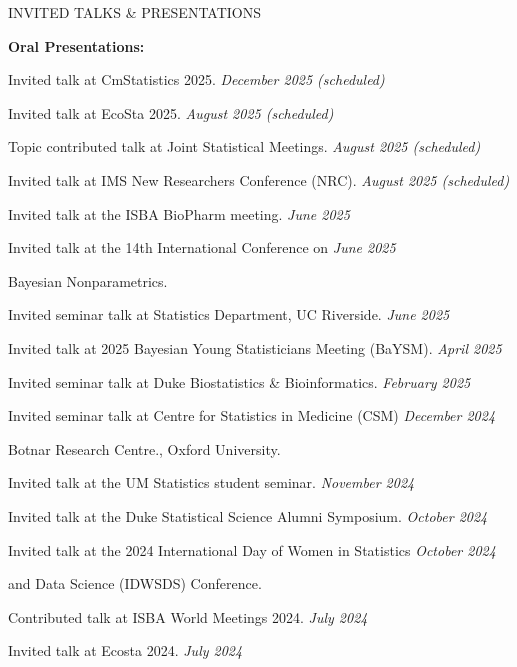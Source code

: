 \documentclass{resume} %
\newcommand{\thisYear}[1]{
	#1
}
\begin{document}
\begin{rSection}{INVITED TALKS \& PRESENTATIONS}
	
	\hspace{-.2in} {\textbf{Oral Presentations:}}
	
	Invited talk at CmStatistics 2025.  \hfill {\em December 2025 (scheduled)}
	
	Invited talk at EcoSta 2025. \hfill {\em August 2025 (scheduled)}
	
	Topic contributed talk at Joint Statistical Meetings. \hfill {\em August 2025 (scheduled)}
	
	Invited talk at IMS New Researchers Conference (NRC). \hfill {\em August 2025 (scheduled)}
	
	Invited talk at the ISBA BioPharm meeting.  \hfill {\em June 2025}
	
	Invited talk at the 14th International Conference on   \hfill {\em June 2025}
	
	\vspace*{-0.1in}
	Bayesian Nonparametrics. 
	
	Invited seminar talk at Statistics Department, UC Riverside.  \hfill {\em June 2025}
	
	Invited talk at 2025 Bayesian Young Statisticians Meeting (BaYSM). \hfill {\em April 2025}
	

	Invited seminar talk at Duke Biostatistics \& Bioinformatics.  \hfill {\em February 2025}

	

	Invited seminar talk at Centre for Statistics in Medicine (CSM)  \hfill {\em December 2024}


	\vspace{-0.1in} 
	Botnar Research Centre., Oxford University. 


	Invited talk at the UM Statistics student seminar.  \hfill {\em November 2024} 

	
	\thisYear{
	Invited talk at the Duke Statistical Science Alumni Symposium.  \hfill {\em October 2024} 
}
	
	Invited talk at the 2024 International Day of Women  in Statistics 
	 \hfill {\em October 2024} 
	
	\vspace{-0.1in} 
	and Data Science (IDWSDS) Conference. 
	
	\thisYear{
	Contributed talk at ISBA World Meetings 2024.  \hfill {\em July 2024}
}
	
	\thisYear{
	Invited talk at Ecosta 2024.  \hfill {\em July 2024}
}
	

\end{rSection}
\end{document}
